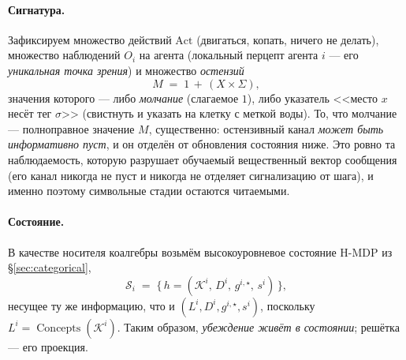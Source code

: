 \documentclass{article}
\begin{document}
\paragraph{Сигнатура.} Зафиксируем множество действий $\mathrm{Act}$
(двигаться, копать, ничего не делать), множество наблюдений $O_i$ на
агента (локальный перцепт агента $i$ --- его \emph{уникальная точка
зрения}) и множество \emph{остензий}
\[
  M \;=\; 1 \,+\, (X\times\Sigma),
\]
значения которого --- либо \emph{молчание} (слагаемое $1$), либо
указатель <<место $x$ несёт тег $\sigma$>> (свистнуть и указать на
клетку с меткой воды). То, что молчание --- полноправное значение $M$,
существенно: остензивный канал \emph{может быть информативно пуст}, и он
отделён от обновления состояния ниже. Это ровно та наблюдаемость,
которую разрушает обучаемый вещественный вектор сообщения (его канал
никогда не пуст и никогда не отделяет сигнализацию от шага), и именно
поэтому символьные стадии остаются читаемыми.

\paragraph{Состояние.} В качестве носителя коалгебры возьмём
высокоуровневое состояние H-MDP из \S\ref{sec:categorical},
\[
  \mathcal{S}_i \;=\; \big\{\, h=(\mathcal{K}^i,\,D^i,\,g^{i,\star},\,s^i) \,\big\},
\]
несущее ту же информацию, что и $(L^i,D^i,g^{i,\star},s^i)$, поскольку
$L^i=\operatorname{Concepts}(\mathcal K^i)$. Таким образом,
\emph{убеждение живёт в состоянии}; решётка --- его проекция.
\end{document}

